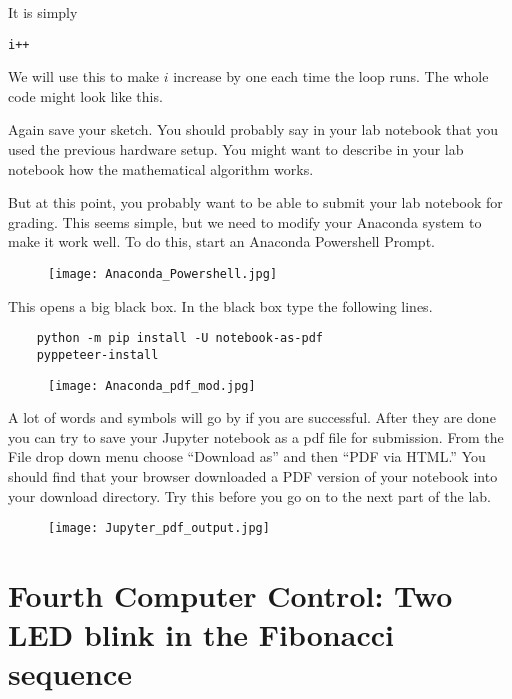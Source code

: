 It is simply

\begin{lstlisting}[language=Arduino]
  i++
\end{lstlisting}

We will use this to make $i$ increase by one each time the loop runs. The whole code might look like this.



Again save your sketch. You should probably say in your lab notebook that
you used the previous hardware setup. You might want to describe in your lab
notebook how the mathematical algorithm works.

But at this point, you probably want to be able to submit your lab notebook for grading. This seems simple, but we need to modify your Anaconda system to make it work well. To do this, start an Anaconda Powershell Prompt.

\begin{figure}[h!]
	\centering
	\texttt{[image: Anaconda\_Powershell.jpg]}
\end{figure}

This opens a big black box. In the black box type the following lines.

\begin{verbatim}
	python -m pip install -U notebook-as-pdf
	pyppeteer-install
\end{verbatim}

\begin{figure}[h!]
	\centering
	\texttt{[image: Anaconda\_pdf\_mod.jpg]}
\end{figure}

A lot of words and symbols will go by if you are successful.  After they are done you can try to save your Jupyter notebook as a pdf file for submission. From the File drop down menu choose ``Download as'' and then ``PDF via HTML.'' You should find that your browser downloaded a PDF version of your notebook into your download directory.  Try this before you go on to the next part of the lab. 

\begin{figure}[h!]
	\centering
	\texttt{[image: Jupyter\_pdf\_output.jpg]}
\end{figure}

\section{Fourth Computer Control: Two LED blink in the Fibonacci sequence}

